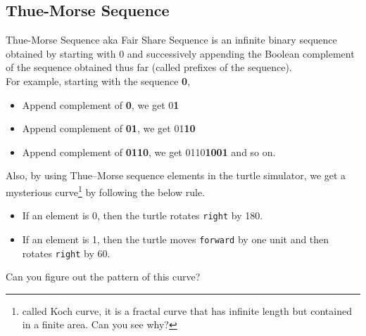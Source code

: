 \subsection{Thue-Morse Sequence}{\label{pp:thuemorsesequence}}
Thue-Morse Sequence aka Fair Share Sequence is an infinite binary sequence obtained by starting with 0 and successively appending the Boolean complement of the sequence obtained thus far (called prefixes of the sequence).\\
For example, starting with the sequence \textbf{0},
\begin{itemize}
	\item Append complement of \textbf{0}, we get 0\textbf{1}
	\item Append complement of \textbf{01}, we get 01\textbf{10}
	\item Append complement of \textbf{0110}, we get 0110\textbf{1001} and so on.
\end{itemize}
Also, by using Thue–Morse sequence elements in the turtle simulator, we get a mysterious curve\footnote{called Koch curve, it is a fractal curve that has infinite length but contained in a finite area. Can you see why?} by following the below rule.
\begin{itemize}
	\item If an element is 0, then the turtle rotates \verb!right! by 180\textdegree.
	\item If an element is 1, then the turtle moves \verb!forward! by one unit and then rotates \verb!right! by 60\textdegree.
\end{itemize}
Can you figure out the pattern of this curve?

